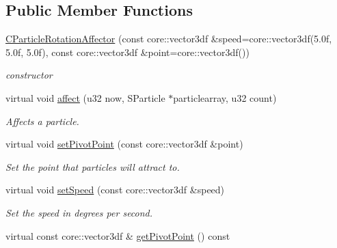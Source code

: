 \subsection*{Public Member Functions}
\begin{DoxyCompactItemize}
\item 
\hypertarget{classirr_1_1scene_1_1_c_particle_rotation_affector_a1cb3a87dd6d89c7842d91061e993fa12}{\hyperlink{classirr_1_1scene_1_1_c_particle_rotation_affector_a1cb3a87dd6d89c7842d91061e993fa12}{C\-Particle\-Rotation\-Affector} (const core\-::vector3df \&speed=core\-::vector3df(5.\-0f, 5.\-0f, 5.\-0f), const core\-::vector3df \&point=core\-::vector3df())}\label{classirr_1_1scene_1_1_c_particle_rotation_affector_a1cb3a87dd6d89c7842d91061e993fa12}

\begin{DoxyCompactList}\small\item\em constructor \end{DoxyCompactList}\item 
virtual void \hyperlink{classirr_1_1scene_1_1_c_particle_rotation_affector_aab8d60c8564cb6bd03166680aa8fe14f}{affect} (u32 now, S\-Particle $\ast$particlearray, u32 count)
\begin{DoxyCompactList}\small\item\em Affects a particle. \end{DoxyCompactList}\item 
\hypertarget{classirr_1_1scene_1_1_c_particle_rotation_affector_ae5ef952da9a846bcf794993de05efee9}{virtual void \hyperlink{classirr_1_1scene_1_1_c_particle_rotation_affector_ae5ef952da9a846bcf794993de05efee9}{set\-Pivot\-Point} (const core\-::vector3df \&point)}\label{classirr_1_1scene_1_1_c_particle_rotation_affector_ae5ef952da9a846bcf794993de05efee9}

\begin{DoxyCompactList}\small\item\em Set the point that particles will attract to. \end{DoxyCompactList}\item 
\hypertarget{classirr_1_1scene_1_1_c_particle_rotation_affector_a8c39939e145a394d3783487ae19c729a}{virtual void \hyperlink{classirr_1_1scene_1_1_c_particle_rotation_affector_a8c39939e145a394d3783487ae19c729a}{set\-Speed} (const core\-::vector3df \&speed)}\label{classirr_1_1scene_1_1_c_particle_rotation_affector_a8c39939e145a394d3783487ae19c729a}

\begin{DoxyCompactList}\small\item\em Set the speed in degrees per second. \end{DoxyCompactList}\item 
\hypertarget{classirr_1_1scene_1_1_c_particle_rotation_affector_ade31f4501e972cb46b785210398ffcff}{virtual const core\-::vector3df \& \hyperlink{classirr_1_1scene_1_1_c_particle_rotation_affector_ade31f4501e972cb46b785210398ffcff}{get\-Pivot\-Point} () const }\label{classirr_1_1scene_1_1_c_particle_rotation_affector_ade31f4501e972cb46b785210398ffcff}


\end{DoxyCompactItemize}
